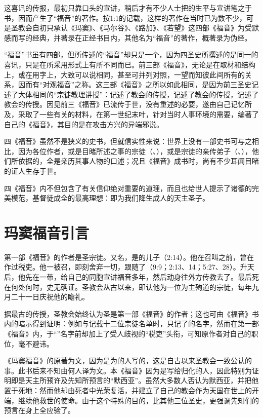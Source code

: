 这喜讯的传报，最初只靠口头的宣讲，稍后才有不少人士把\UL[耶稣]的生平与宣讲笔之于书，因而产生了“福音”的著作。按1:1的记载，这样的著作在当时已为数不少，可是圣教会自初只承认《玛窦》、《马尔谷》、《路加》、《若望》这四部《福音》为受默感而写的经典，并著录在正经书目内，其他名为“福音”的著作，概著录为伪经。

“福音”书虽有四部，但所传述的“福音”却只是一个，因为四圣史所撰述的是同一的喜讯，只是在所采用形式上有所不同而已。前三部《福音》，无论是在取材和结构上，或在用字上，大致可以说相同，甚至可并列对照，一望而知彼此间所有的关系，因而有“对观福音”之称。这三部《福音》之所以如此相同，是因为前三圣史记述了大体相同的“宗徒教理讲授”：\UL[玛窦]记述了\UL[耶路撒冷]教会的传授，\UL[马尔谷]记述了\UL[罗马]教会的传授，\UL[路加]记述了\UL[安提约基雅]教会的传授。\UL[若望]因见前三《福音》已流传于世，没有重述的必要，遂由自己记忆所及，采取了一些有关的材料，在第一世纪末叶，针对当时人事环境的需要，编著了自己的《福音》，其目的是在攻击方兴的异端邪说。

四《福音》虽然不是狭义的史书，但就信实性来说：世界上没有一部史书可与之相比，因为各位作者，或是目睹所述之事的宗徒（\UL[玛窦]、\UL[若望]），或是宗徒的亲传弟子（\UL[马尔谷]、\UL[路加]），他们所依据的，全是亲历其事人物的口述；况且《福音》成书时，尚有不少耳闻目睹的证人生存于世。

四《福音》内不但包含了有关信仰绝对重要的道理，而且也给世人提示了诸德的完美模范，基督徒成全的最高理想：即为我们降生成人的天主圣子。


\chapter*{玛窦福音引言}
第一部《福音》的作者是圣\UL[玛窦]宗徒。\UL[玛窦]又名\UL[肋未]，是\UL[阿耳斐]的儿子（2:14）。他在\UL[耶稣]召叫之前，曾在\UL[葛法翁]作过税吏。他一被召，即刻舍弃一切，跟随了\UL[耶稣]（9:9；2:13、14；5:27、28）。\UL[耶稣]升天后，他先在\UL[巴力斯坦]一带，给自己的同胞宣讲福音多年，然后动身往外方传教去了。最后死在何处何时，史无确证。圣教会从古以来，即认他为一位为主殉道的宗徒，每年九月二十一日庆祝他的瞻礼。

据最古的传授，圣教会始终认为圣\UL[玛窦]是第一部《福音》的作者；这也可由《福音》书内的暗示得到证明：例如\UL[马尔谷]与\UL[路加]记载十二位宗徒名单时，只记了\UL[玛窦]的名字，然而在第一部《福音》内，于“\UL[玛窦]”名字前却加上了受人歧视的“税吏”头衔，可知原作者对自己的职位，毫不避讳。

《玛窦福音》的原著为\UL[阿刺美]文，因为是为\UL[巴力斯坦]的\UL[犹太]人写的，这是自古以来圣教会一致公认的事。此书后来不知由何人译为\UL[希腊]文。本《福音》因为是写给归化的\UL[犹太]人，因此特别为证明\UL[耶稣]\UL[基督]即是天主所预许及先知所预言的“默西亚”。虽然大多数\UL[犹太]人否认\UL[耶稣]为默西亚，并把他置于死地：然而他却由死者中光荣复活，并建立了自己的教会作为天国在世上的开端，继续他救世的使命。由于这个特殊的目的，\UL[玛窦]比其他三位圣史，更强调先知们的预言在\UL[耶稣]身上全应验了。

